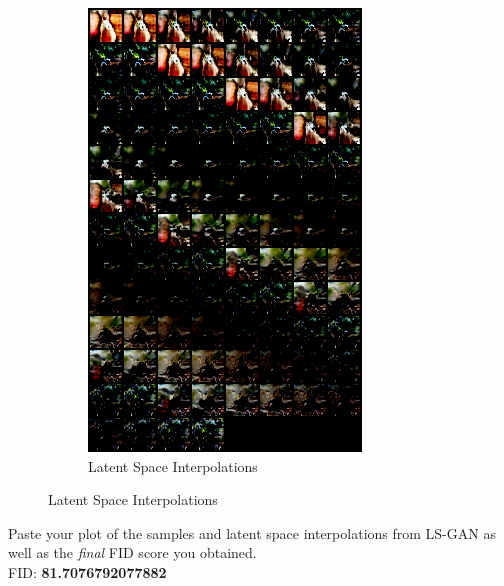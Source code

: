 \documentclass[11pt,addpoints,answers]{exam}
\numberwithin{equation}{section} %
\numberwithin{figure}{section} %
\numberwithin{table}{section} %
\begin{document}
\begin{questions}
\begin{figure}[H]
\begin{subfigure}[b]{0.32\linewidth}
        \includegraphics[width=\linewidth]{1.3_interpolations.png}
        \caption{Latent Space Interpolations}
    \end{subfigure}
\end{figure}
\question Paste your plot of the samples and latent space interpolations from LS-GAN as well as the \textit{final} FID score you obtained. 
\\
FID: \textbf{81.7076792077882} 
\begin{figure}[H]
    \centering
    \begin{subfigure}[b]{0.32\linewidth}

\end{subfigure}
\end{figure}
\end{questions}
\end{document}

